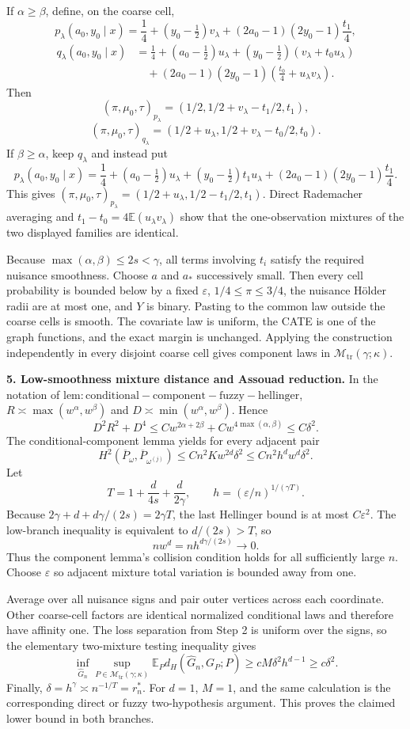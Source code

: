 If \(\alpha\ge\beta\), define, on the coarse cell,
\[
 p_\lambda(a_0,y_0\mid x)=\frac14+(y_0-\tfrac12)v_\lambda
 +(2a_0-1)(2y_0-1)\frac{t_1}{4},
\]
\[
\begin{aligned}
 q_\lambda(a_0,y_0\mid x)
 &=\frac14+(a_0-\tfrac12)u_\lambda
 +(y_0-\tfrac12)(v_\lambda+t_0u_\lambda)\\
 &\quad +(2a_0-1)(2y_0-1)
 \left(\frac{t_0}{4}+u_\lambda v_\lambda\right).
\end{aligned}
\]
Then
\[
(\pi,\mu_0,\tau)_{p_\lambda}
 =(1/2,1/2+v_\lambda-t_1/2,t_1),
\]
\[
(\pi,\mu_0,\tau)_{q_\lambda}
 =(1/2+u_\lambda,1/2+v_\lambda-t_0/2,t_0).
\]
If \(\beta\ge\alpha\), keep \(q_\lambda\) and instead put
\[
 p_\lambda(a_0,y_0\mid x)=\frac14+(a_0-\tfrac12)u_\lambda
 +(y_0-\tfrac12)t_1u_\lambda
 +(2a_0-1)(2y_0-1)\frac{t_1}{4}.
\]
This gives \((\pi,\mu_0,\tau)_{p_\lambda}=(1/2+u_\lambda,1/2-t_1/2,t_1)\). Direct Rademacher averaging and \(t_1-t_0=4\mathbb E(u_\lambda v_\lambda)\) show that the one-observation mixtures of the two displayed families are identical.

Because \(\max(\alpha,\beta)\le2s<\gamma\), all terms involving \(t_i\) satisfy the required nuisance smoothness. Choose \(a\) and \(a_*\) successively small. Then every cell probability is bounded below by a fixed \(\varepsilon\), \(1/4\le\pi\le3/4\), the nuisance Hölder radii are at most one, and \(Y\) is binary. Pasting to the common law outside the coarse cells is smooth. The covariate law is uniform, the CATE is one of the graph functions, and the exact margin is unchanged. Applying the construction independently in every disjoint coarse cell gives component laws in \(\mathcal M_{\mathrm{tr}}(\gamma;\kappa)\).

\textbf{5. Low-smoothness mixture distance and Assouad reduction.} In the notation of \(\mathrm{lem:conditional-component-fuzzy-hellinger}\), \(R\asymp\max(w^\alpha,w^\beta)\) and \(D\asymp\min(w^\alpha,w^\beta)\). Hence
\[
D^2R^2+D^4
 \le Cw^{2\alpha+2\beta}+Cw^{4\max(\alpha,\beta)}
 \le C\delta^2.
\]
The conditional-component lemma yields for every adjacent pair
\[
H^2(\overline P_\omega,\overline P_{\omega^{(j)}})
 \le Cn^2Kw^{2d}\delta^2
 \le Cn^2h^dw^d\delta^2.
\]
Let
\[
T=1+\frac d{4s}+\frac d{2\gamma},
\qquad
h=(\varepsilon/n)^{1/(\gamma T)}.
\]
Because \(2\gamma+d+d\gamma/(2s)=2\gamma T\), the last Hellinger bound is at most \(C\varepsilon^2\). The low-branch inequality is equivalent to \(d/(2s)>T\), so
\[
nw^d=nh^{d\gamma/(2s)}\longrightarrow0.
\]
Thus the component lemma's collision condition holds for all sufficiently large \(n\). Choose \(\varepsilon\) so adjacent mixture total variation is bounded away from one.

Average over all nuisance signs and pair outer vertices across each coordinate. Other coarse-cell factors are identical normalized conditional laws and therefore have affinity one. The loss separation from Step 2 is uniform over the signs, so the elementary two-mixture testing inequality gives
\[
\inf_{\widehat G_n}\sup_{P\in\mathcal M_{\mathrm{tr}}(\gamma;\kappa)}
 \mathbb E_Pd_H(\widehat G_n,G_P;P)
 \ge cM\delta^2h^{d-1}\ge c\delta^2.
\]
Finally, \(\delta=h^\gamma\asymp n^{-1/T}=r_n^*\). For \(d=1\), \(M=1\), and the same calculation is the corresponding direct or fuzzy two-hypothesis argument. This proves the claimed lower bound in both branches.